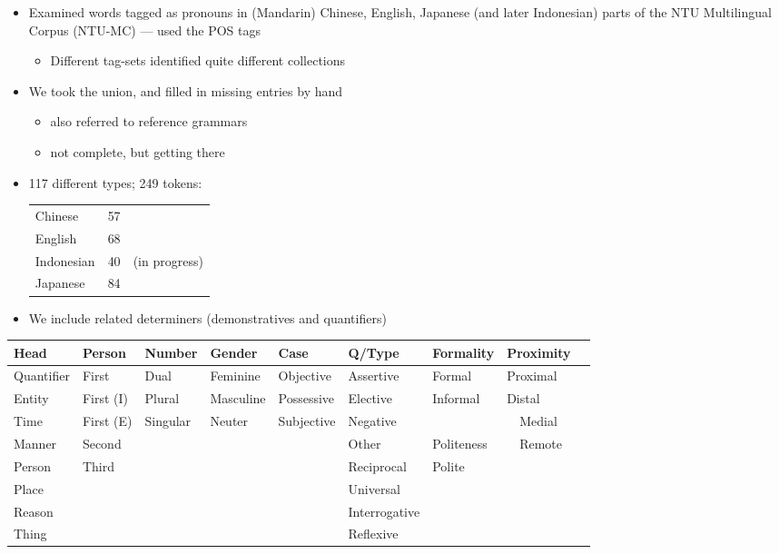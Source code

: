 \documentclass[a4paper,landscape,headrule,footrule,dvips]{foils}
\begin{document}
\begin{CJK}{UTF8}{min}
    \begin{itemize}
       \item Examined words tagged as pronouns in (Mandarin) Chinese, English,
         Japanese (and later Indonesian) parts of the NTU Multilingual
         Corpus (NTU-MC) --- used the POS tags
         \begin{itemize}
         \item Different tag-sets identified quite different collections
         \end{itemize}
       \item We took the union, and filled in missing entries by hand
         \begin{itemize}
         \item also referred to reference grammars
         \item not complete, but getting there 
         \end{itemize}
       \item 117 different types; 249 tokens:
         \begin{tabular}[t]{lrl}
           Chinese & 57\\
           English & 68\\
           Indonesian & 40 & (in progress)\\
           Japanese & 84 
         \end{tabular}
       \item We include related determiners (demonstratives and quantifiers)
       \end{itemize}

\hspace*{-5em}
{\small
\begin{tabular}{lllllllll}
Head &
Person &
Number &
Gender &
Case &
Q/Type &
Formality &
Proximity
\\\hline
Quantifier &
First &
Dual &
Feminine &
Objective &
Assertive &
Formal &
Proximal
\\
Entity &
First (I) & 
Plural &
Masculine &
Possessive &
Elective &
Informal &
Distal
\\
Time &
First (E) & 
Singular &
Neuter &
Subjective &
Negative &
~ &
~~Medial
\\
Manner &
Second &
~ &
~ &
~ &
Other &
Politeness &
~~Remote\\ \cline{7-7}
Person &
Third &
~ &
~ &
~ &
Reciprocal &
Polite &
~ \\
Place &
~ &
~ &
~ &
~ &
Universal &
~ &
~\\
Reason &
~ &
~ &
~ &
~ &
Interrogative &
~ &
~\\
Thing  &
~ &
~ &
~ &
~ &
Reflexive &
~ &
~\\
\end{tabular}}


\end{CJK}
\end{document}
